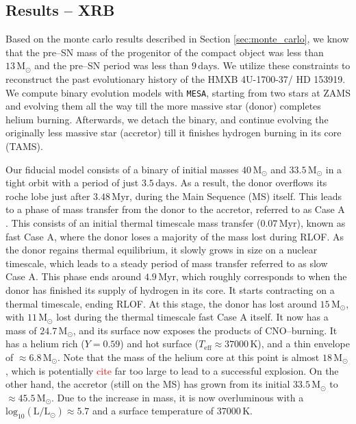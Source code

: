 \documentclass[linenumbers,trackchanges,twocolumn]{aastex701}
\newcommand{\Mdot}{\mathrm{M}_{\odot}}
\newcommand{\Ldot}{\mathrm{L}_{\odot}}
\newcommand{\red}{\textcolor{red}}
\begin{document}
\subsection{Results -- XRB}

Based on the monte carlo results described in Section \ref{sec:monte_carlo}, we know that the pre--SN mass of the progenitor of the compact object was less than $13\,\Mdot$ and the pre--SN period was less than $9\, \mathrm{days}$. We utilize these constraints to reconstruct the past evolutionary history of the HMXB 4U-1700-37/ HD 153919. We compute binary evolution models with \texttt{MESA}, starting from two stars at ZAMS and evolving them all the way till the more massive star (donor) completes helium burning. Afterwards, we detach the binary, and continue evolving the originally less massive star (accretor) till it finishes hydrogen burning in its core (TAMS). 

Our fiducial model consists of a binary of initial masses $40\,\Mdot$ and $33.5\,\Mdot$ in a tight orbit with a period of just $3.5\,\mathrm{days}$. As a result, the donor overflows its roche lobe just after $3.48 \,\mathrm{Myr}$, during the Main Sequence (MS) itself. This leads to a phase of mass transfer from the donor to the accretor, referred to as Case A \cite{1967ZA.....65..251K}. This consists of an initial thermal timescale mass transfer ($0.07\, \mathrm{Myr}$), known as fast Case A, where the donor loses a majority of the mass lost during RLOF. As the donor regains thermal equilibrium, it slowly grows in size on a nuclear timescale, which leads to a steady period of mass transfer referred to as slow Case A. This phase ends around $4.9\,\mathrm{Myr}$, which roughly corresponds to when the donor has finished its supply of hydrogen in its core. It starts contracting on a thermal timescale, ending RLOF. At this stage, the donor has lost around $15\,\Mdot$, with $11\,\Mdot$ lost during the thermal timescale fast Case A itself. It now has a mass of $24.7\,\Mdot$, and its surface now exposes the products of CNO--burning. It has a helium rich ($Y = 0.59$) and hot surface ($T_{\mathrm{eff}} \approx 37000\,\mathrm{K}$), and a thin envelope of $\approx 6.8\,\Mdot$. Note that the mass of the helium core at this point is almost $18\,\Mdot$, which is potentially \red{cite} far too large to lead to a successful explosion. On the other hand, the accretor (still on the MS) has grown from its initial $33.5\,\Mdot$ to $\approx 45.5\,\Mdot$. Due to the increase in mass, it is now overluminous with a $\mathrm{log_{10}}(\mathrm{L}/\Ldot) \approx 5.7$ and a surface temperature of $37000\,\mathrm{K}$.
\end{document}
